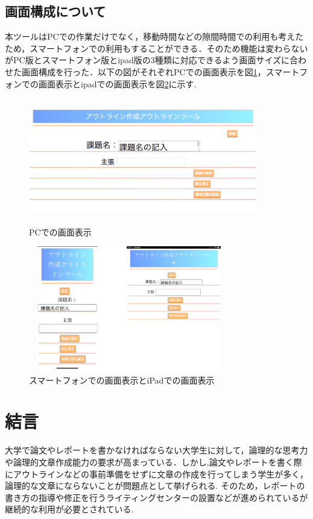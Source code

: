 \documentclass[a4j,12pt]{jarticle}
\begin{document}
\newpage
\subsection{画面構成について}
本ツールはPCでの作業だけでなく，移動時間などの隙間時間での利用も考えたため，スマートフォンでの利用もすることができる．そのため機能は変わらないがPC版とスマートフォン版とipad版の3種類に対応できるよう画面サイズに合わせた画面構成を行った．以下の図がそれぞれPCでの画面表示を図\ref{fig:p}，スマートフォンでの画面表示とipadでの画面表示を図\ref{fig:q}に示す.
\begin{figure}[h]
\begin{center}
 \includegraphics[clip,width=100mm,height=55mm]{figure/08gamen.png}
\end{center}
 \caption{PCでの画面表示}
 \label{fig:p}
\end{figure}

\begin{figure}[h]
\begin{center}
 \includegraphics[clip,width=88mm,height=55mm]{figure/17.png}
\end{center}
 \caption{スマートフォンでの画面表示とiPadでの画面表示}
 \label{fig:q}
\end{figure}
\newpage

\section{結言}
大学で論文やレポートを書かなければならない大学生に対して，論理的な思考力や論理的文章作成能力の要求が高まっている．しかし,論文やレポートを書く際にアウトラインなどの事前準備をせずに文章の作成を行ってしまう学生が多く，論理的な文章にならないことが問題点として挙げられる.
そのため，レポートの書き方の指導や修正を行うライティングセンターの設置などが進められているが継続的な利用が必要とされている.
\end{document}
